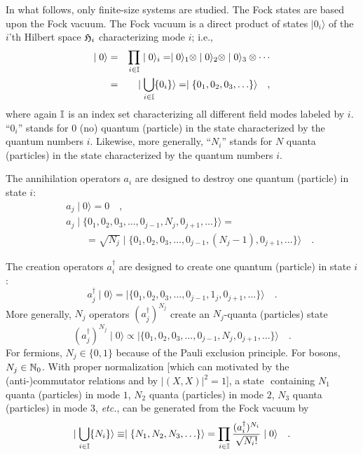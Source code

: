 In what follows, only finite-size systems
are studied.
The Fock states are based upon the Fock vacuum.
The Fock vacuum is a direct product of states $\mid  0_i\rangle $
of the $i$'th Hilbert space ${\cal H}_i$ characterizing mode $i$; i.e.,
\begin{eqnarray}
\mid 0\rangle
&=& \prod_{i\in {\Bbb I}} \mid  0 \rangle_i
=
\mid  0 \rangle_1 \otimes
\mid  0 \rangle_2 \otimes
\mid  0 \rangle_3 \otimes
\cdots
\nonumber \\
&=&\mid \bigcup_{i\in {\Bbb I}} \{0_{i}\} \rangle
=
\mid \{
0_{1},
0_{2},
0_{3},
\ldots
\}\rangle
\quad ,
\end{eqnarray}
where again ${\Bbb I}$ is an index set characterizing all different
field modes labeled by $i$.
``$0_{i}$'' stands for $0$ (no) quantum (particle)
in the state characterized by the quantum numbers ${i}$.
Likewise, more generally,
``$N_{i}$'' stands for $N$  quanta (particles)
in the state characterized by the quantum numbers ${i}$.



The annihilation operators
$
a_{i}
$
are designed to destroy one quantum (particle) in state ${i}$:
\begin{eqnarray}
&&a_{j} \mid 0\rangle
=0\quad ,\\
&&a_{j}
\mid \{
0_{1},
0_{2},
0_{3},
\ldots ,
0_{{j-1}},
N_{j},
0_{{j+1}}, \ldots
\}\rangle
= \nonumber \\
&&\qquad = \sqrt{N_{j}}
\mid \{
0_{1},
0_{2},
0_{3},
\ldots ,
0_{{j-1}},
(N_{j}-1),
0_{{j+1}}, \ldots
\}\rangle
\quad .
\end{eqnarray}



The creation operators
$
a_{i}^\dagger
$
are designed to create one quantum (particle) in state ${i}$:
\begin{equation}
a_{j}^\dagger
\mid 0 \rangle
=
\mid \{
0_{1},
0_{2},
0_{3},
\ldots ,
0_{{j-1}},
1_{j},
0_{{j+1}}, \ldots
\}\rangle
\quad .
\end{equation}
More generally,
$N_{j}$ operators
$(a_{j}^\dagger )^{N_{j}}$
 create an $N_{j}$-quanta
(particles) state
\begin{equation}
(a_{j}^\dagger )^{N_{j}}
\mid 0\rangle
\propto
\mid \{
0_{1},
0_{2},
0_{3},
\ldots ,
0_{{j-1}},
N_{j},
0_{{j+1}}, \ldots
\}\rangle
\quad .
\end{equation}
For fermions, $N_{j}\in \{ 0,1\}$ because of the Pauli exclusion
principle. For bosons, $N_{j}\in {\Bbb N}_0$.
With proper normalization [which can motivated by
the
(anti-)commutator relations and by  $\vert ( X, X)
\vert^2
=1$], a state
$
$
containing
$
N_{1}
$
quanta (particles) in mode ${1}$,
$
N_{2}
$
quanta (particles) in mode ${2}$,
$
N_{3}
$
quanta (particles) in mode ${3}$, {\it etc.}, can be generated from
the Fock vacuum by
\begin{equation}
\mid \bigcup_{ i\in {\Bbb I}} \{N_{i}\} \rangle
\equiv
\mid \{
N_{1},
N_{2},
N_{3},
\ldots
\}\rangle
=
\prod_{i\in {\Bbb I}}{(a_{i}^\dagger )^{N_{i}}\over
\sqrt{N_{i}!}}
\mid 0 \rangle
\quad .
\label{el:a3}
\end{equation}

